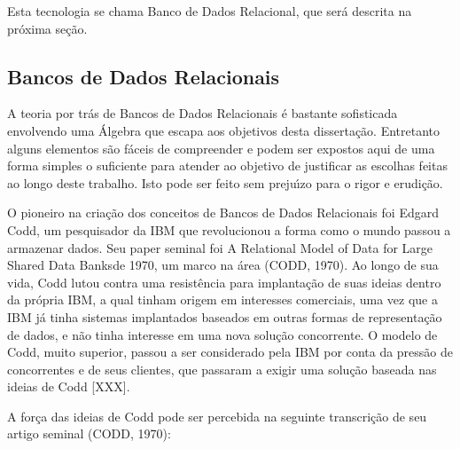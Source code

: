 \documentclass[
12pt,		%
openright,	%
twoside,  %
a4paper,			%
chapter=TITLE,		%
english,			%
french,				%
spanish,			%
brazil				%
]{USPSC-classe/USPSC_RedarTex}
\begin{document}
Esta tecnologia se chama \textquotedbl Banco de Dados Relacional\textquotedbl , que ser\'a descrita na pr\'oxima se\c{c}\~ao.








\subsection[Bancos de Dados Relacionais]{Bancos de Dados Relacionais}\label{Bancos de Dados Relacionais}
A teoria por tr\'as de Bancos de Dados Relacionais \'e bastante sofisticada envolvendo uma \'Algebra que escapa aos objetivos desta disserta\c{c}\~ao. Entretanto alguns elementos s\~ao f\'aceis de compreender e podem ser expostos aqui de uma forma simples o suficiente para atender ao objetivo de justificar as escolhas feitas ao longo deste trabalho. Isto pode ser feito sem preju\'{\i}zo para o rigor e erudi\c{c}\~ao.








O pioneiro na cria\c{c}\~ao dos conceitos de Bancos de Dados Relacionais foi Edgard Codd, um pesquisador da IBM que revolucionou a forma como o mundo passou a armazenar dados. Seu paper seminal foi  \textquotedbl A Relational Model of Data for Large Shared Data Banks\textquotedbl  de 1970, um marco na \'area (CODD, 1970). Ao longo de sua vida, Codd lutou contra uma resist\^encia para implanta\c{c}\~ao de suas ideias dentro da pr\'opria IBM, a qual tinham origem em interesses comerciais, uma vez que a IBM j\'a tinha sistemas implantados baseados em outras formas de representa\c{c}\~ao de dados, e n\~ao tinha interesse em uma nova solu\c{c}\~ao concorrente. O modelo de Codd, muito superior, passou a ser considerado pela IBM por conta da press\~ao de concorrentes e de seus clientes, que passaram a exigir uma solu\c{c}\~ao baseada nas ideias de Codd [XXX].








A for\c{c}a das ideias de Codd pode ser percebida na seguinte transcri\c{c}\~ao de seu artigo seminal (CODD, 1970):
\end{document}

